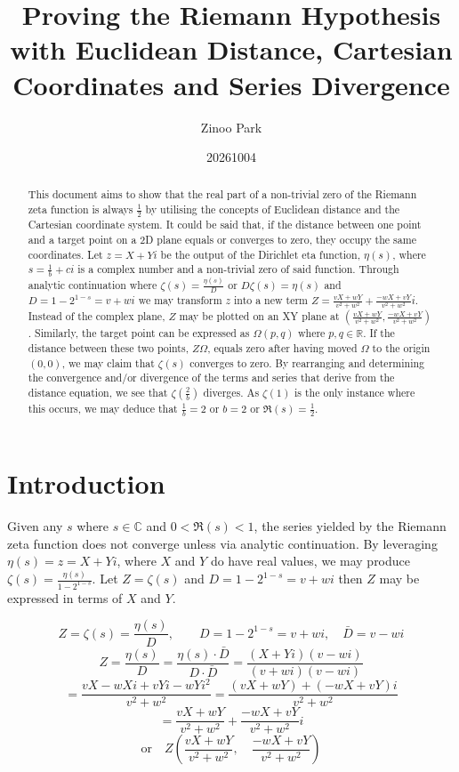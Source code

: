 \documentclass{amsart}
\title[RH Euclidean Cartesian]{Proving the Riemann Hypothesis \\
	with Euclidean Distance, Cartesian Coordinates and Series Divergence}
\author{Zinoo Park}
\date{20261004}
\begin{document}
	\maketitle
	
	\begin{abstract}
		This document aims to show that the real part of a non-trivial zero of the Riemann zeta function is always $\frac12$ by utilising the concepts of Euclidean distance and the Cartesian coordinate system. It could be said that, if the distance between one point and a target point on a 2D plane equals or converges to zero, they occupy the same coordinates. Let $z=X+Yi$ be the output of the Dirichlet eta function, $\eta(s)$, where $s=\frac{1}{b} + ci$ is a complex number and a non-trivial zero of said function. Through analytic continuation where $\zeta(s) = \frac{\eta(s)}{D}$ or $D\zeta(s) = \eta(s)$ and $D=1-2^{1-s}=v+wi$ we may transform $z$ into a new term $Z = \frac{vX+wY}{v^2+w^2} + \frac{-wX+vY}{v^2+w^2}i$. Instead of the complex plane, $Z$ may be plotted on an XY plane at $(\frac{vX+wY}{v^2+w^2}, \frac{-wX+vY}{v^2+w^2})$. Similarly, the target point can be expressed as $\Omega(p, q)$ where $p, q \in \mathbb{R}$. If the distance between these two points, $Z\Omega$, equals zero after having moved $\Omega$ to the origin $(0,0)$, we may claim that $\zeta(s)$ converges to zero. By rearranging and determining the convergence and/or divergence of the terms and series that derive from the distance equation, we see that $\zeta(\frac{2}{b})$ diverges. As $\zeta(1)$ is the only instance where this occurs, we may deduce that $\frac{1}{b}=2$ or $b=2$ or $\Re(s)=\frac{1}{2}$.
	\end{abstract}
	
	\section{Introduction}
	Given any $s$ where $s \in \mathbb{C}$ and $0<\Re(s)<1$, the series yielded by the Riemann zeta function does not converge unless via analytic continuation. By leveraging $\eta(s) = z = X+Yi$, where $X$ and $Y$ do have real values, we may produce $\zeta(s) = \frac{\eta(s)}{1-2^{1-s}}$. Let $Z = \zeta(s)$ and $D = 1-2^{1-s} = v + wi$ then $Z$ may be expressed in terms of $X$ and $Y$.
	
	\[ Z = \zeta(s) = \frac{\eta(s)}{D}, \qquad D = 1-2^{1-s} = v + wi, \quad \bar{D} = v - wi \]
	\[ Z = \frac{\eta(s)}{D} = \frac{\eta(s) \cdot \bar{D}}{D \cdot \bar{D}} = \frac{(X+Yi)(v-wi)}{(v+wi)(v-wi)} \]
	\[ = \frac{vX-wXi+vYi-wYi^2}{v^2+w^2} = \frac{(vX+wY)+(-wX+vY)i}{v^2+w^2} \]
	\[ = \frac{vX+wY}{v^2+w^2} + \frac{-wX+vY}{v^2+w^2}i \]
	\[ \text{or} \quad Z(\frac{vX+wY}{v^2+w^2}, \quad \frac{-wX+vY}{v^2+w^2}) \]
	
\end{document}
